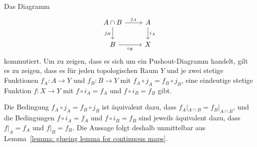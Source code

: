 Das Diagramm
\[
  \begin{tikzcd}
      A \cap B
      \arrow{r}{j_A}
      \arrow[swap]{d}{j_B}
    & A
      \arrow{d}{i_A}
    \\
      B
      \arrow[swap]{r}{i_B}
    & X
  \end{tikzcd}
\]
kommutiert.
Um zu zeigen, dass es sich um ein Pushout-Diagramm handelt, gilt es zu zeigen, dass es für jeden topologischen Raum $Y$ und je zwei stetige Funktionen $f_A \colon A \to Y$ und $f_B \colon B \to Y$ mit $f_A \circ j_A = f_B \circ j_B$, eine eindeutige stetige Funktion $f \colon X \to Y$ mit $f \circ i_A = f_A$ und $f \circ i_B = f_B$ gibt.

Die Bedingung $f_A \circ j_A = f_B \circ j_B$ ist äquivalent dazu, dass $f_A|_{A \cap B} = f_B|_{A \cap B}$, und die Bedingungen $f \circ i_A = f_A$ und $f \circ i_B = f_B$ sind jeweils äquivalent dazu, dass $f|_A = f_A$ und $f|_B = f_B$.
Die Aussage folgt deshalb unmittelbar aus Lemma~\ref{lemma: glueing lemma for continuous maps}.




